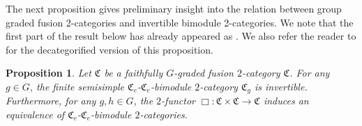 \documentclass[11pt]{article}
\numberwithin{equation}{section}
\newtheorem{Proposition}[Theorem]{Proposition}
{ \theoremstyle{definition}
\newtheorem{Definition}[Theorem]{Definition}
\newtheorem{Note}[Theorem]{Note}
\newtheorem{Construction}[Theorem]{Construction}
\newtheorem{Example}[Theorem]{Example}
\newtheorem{Remark}[Theorem]{Remark} }
\numberwithin{equation}{section}
\begin{document}
The next proposition gives preliminary insight into the relation between group graded fusion 2-categories and invertible bimodule 2-categories. We note that the first part of the result below has already appeared as \cite[Proposition~3.1.7]{DY23}. We also refer the reader to \cite[Theorem~6.1]{ENO2} for the decategorified version of this proposition.

\begin{Proposition}\label{prop:gradedMoritaequivalence}
Let $\mathfrak{C}$ be a faithfully $G$-graded fusion $2$-category $\mathfrak{C}$. For any $g\in G$, the finite semisimple $\mathfrak{C}_e$-$\mathfrak{C}_e$-bimodule $2$-category $\mathfrak{C}_g$ is invertible. Furthermore, for any $g,h\in G$, the $2$-functor $\Box\colon\mathfrak{C}\times\mathfrak{C}\rightarrow \mathfrak{C}$ induces an equivalence  of $\mathfrak{C}_e$-$\mathfrak{C}_e$-bimodule $2$-categories.
\end{Proposition}
\end{document}
